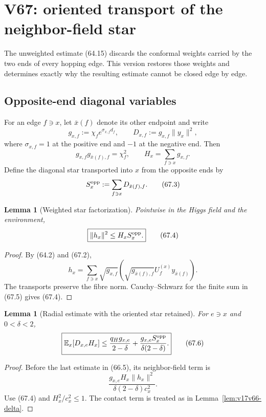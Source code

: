 \documentclass[11pt]{article}
\newtheorem{lemma}[theorem]{Lemma}
\theoremstyle{remark}
\begin{document}
\section{V67: oriented transport of the neighbor-field star}
\label{sec:v17v67}

The unweighted estimate (64.15) discards the conformal weights carried
by the two ends of every hopping edge.  This version restores those
weights and determines exactly why the resulting estimate cannot be
closed edge by edge.

\subsection{Opposite-end diagonal variables}

For an edge \(f\ni x\), let \(\bar x(f)\) denote its other endpoint and
write
\[
 g_{x,f}:=\chi_f e^{\sigma_{x,f}d_f},
 \qquad
 D_{x,f}:=g_{x,f}\|y_x\|^2,                       \tag{67.1}
\]
where \(\sigma_{x,f}=1\) at the positive end and \(-1\) at the
negative end.  Then
\[
 g_{x,f}g_{\bar x(f),f}=\chi_f^2,
 \qquad
 H_x=\sum_{f\ni x}g_{x,f}.                        \tag{67.2}
\]
Define the diagonal star transported into \(x\) from the opposite
ends by
\[
 S_x^{\rm opp}:=
 \sum_{f\ni x}D_{\bar x(f),f}.                   \tag{67.3}
\]

\begin{lemma}[Weighted star factorization]
\label{lem:v17v67-weighted-star}
Pointwise in the Higgs field and the environment,
\[
\boxed{
 \|h_x\|^2\leq H_x S_x^{\rm opp}.}               \tag{67.4}
\]
\end{lemma}

\begin{proof}
By (64.2) and (67.2),
\[
 h_x=
 \sum_{f\ni x}
 \sqrt{g_{x,f}}
 \left(\sqrt{g_{\bar x(f),f}}
 U_f^{(x)}y_{\bar x(f)}\right).                  \tag{67.5}
\]
The transports preserve the fibre norm.  Cauchy--Schwarz for the
finite sum in (67.5) gives (67.4).
\end{proof}

\begin{lemma}[Radial estimate with the oriented star retained]
\label{lem:v17v67-radial}
For \(e\ni x\) and \(0<\delta<2\),
\[
\boxed{
 \mathbb E_x[D_{x,e}H_x]
 \leq
 \frac{q_Hg_{x,e}}{2-\delta}
 +\frac{g_{x,e}S_x^{\rm opp}}
       {\delta(2-\delta)}.}                      \tag{67.6}
\]
\end{lemma}

\begin{proof}
Before the last estimate in (66.5), its neighbor-field term is
\[
 \frac{g_{x,e}H_x\|h_x\|^2}
      {\delta(2-\delta)c_x^2}.                   \tag{67.7}
\]
Use (67.4) and \(H_x^2/c_x^2\leq1\).  The contact term is treated as
in Lemma~\ref{lem:v17v66-delta}.
\end{proof}
\end{document}

